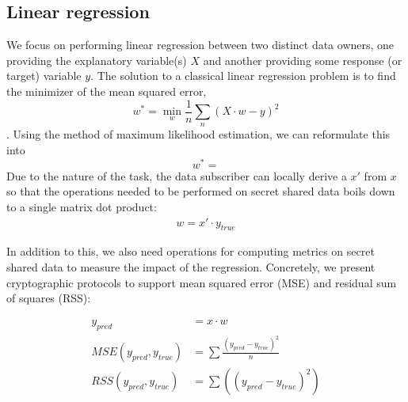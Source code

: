 
\subsection{Linear regression}
\label{sec:linreg}

We focus on performing linear regression between two distinct data owners, one providing the explanatory variable(s) $X$ and another providing some response (or target) variable $y$. The solution to a classical linear regression problem is to find the minimizer of the mean squared error, $$ w^* = \min_{w}\frac{1}{n}\sum_{n} (X \cdot w - y)^2 $$. Using the method of maximum likelihood estimation, we can reformulate this into $$w^* = $$
Due to the nature of the task, the data subscriber can locally derive a $x'$ from $x$ so that the operations needed to be performed on secret shared data boils down to a single matrix dot product:
\begin{align*}
w = x' \cdot y_{\mathit{true}}
\end{align*}

In addition to this, we also need operations for computing metrics on secret shared data to measure the impact of the regression. Concretely, we present cryptographic protocols to support mean squared error (MSE) and residual sum of squares (RSS):

\begin{align*}
y_{\mathit{pred}} &= x \cdot w
\\
\mathit{MSE}(y_{\mathit{pred}}, y_{\mathit{true}}) &= \sum \frac{ (y_{\mathit{pred}} - y_{\mathit{true}})^2 }{n}
\\
\mathit{RSS}(y_{\mathit{pred}}, y_{\mathit{true}}) &= \sum \left( (y_{\mathit{pred}} - y_{\mathit{true}})^2 \right)
\end{align*}





